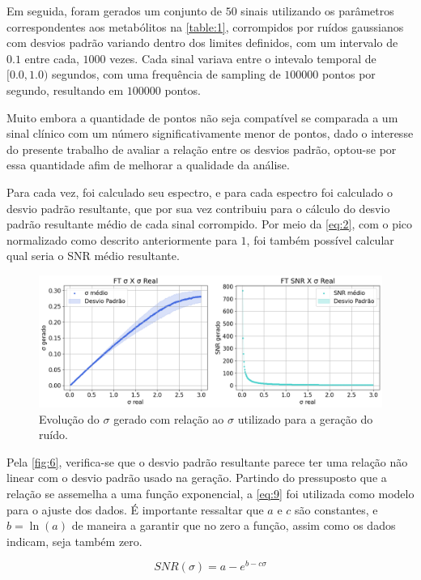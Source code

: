 \documentclass[
12pt,		
twoside, 
a4paper,
chapter=TITLE,
english,			
brazil]{USPSC-classe/USPSC}
\begin{document}
Em seguida, foram gerados um conjunto de $50$ sinais utilizando os parâmetros correspondentes aos metabólitos na \autoref{table:1}, corrompidos por ruídos gaussianos com desvios padrão variando dentro dos limites definidos, com um intervalo de $0.1$ entre cada, $1000$ vezes. Cada sinal variava 
entre o intevalo temporal de $[0.0, 1.0)$ segundos, com uma frequência de sampling de $100000$ pontos por segundo, resultando em $100000$ pontos. 

Muito embora a quantidade de pontos não seja compatível se comparada a um sinal clínico com um número significativamente menor de pontos, dado o interesse do presente trabalho de avaliar a relação entre os desvios padrão, optou-se por essa quantidade afim de melhorar a qualidade da análise.

Para cada vez, foi calculado seu espectro, e para cada espectro foi calculado o desvio padrão resultante, que por sua vez contribuiu para o cálculo do desvio padrão 
resultante médio de cada sinal corrompido. Por meio da \autoref{eq:2}, com o pico normalizado como descrito anteriormente para $1$, foi também possível calcular qual seria o SNR médio resultante.

\begin{figure} [H]
    \includegraphics[scale=0.37]{evolucao-sigmas.png}
    \centering
    \caption{Evolução do $\sigma$ gerado com relação ao $\sigma$ utilizado para a geração do ruído.}
    \label{fig:6}
\end{figure}

Pela \autoref{fig:6}, verifica-se que o desvio padrão resultante parece ter uma relação não linear com o desvio padrão usado na geração. Partindo do pressuposto que a relação se assemelha a uma função exponencial, a \autoref{eq:9} foi utilizada como modelo para o ajuste dos dados. É importante ressaltar que 
$a$ e $c$ são constantes, e $b = \ln(a)$ de maneira a garantir que no zero a função, assim como os dados indicam, seja também zero.

\begin{equation} \label{eq:9}
    SNR(\sigma) = a - e^{b - c\sigma} 
\end{equation}
\end{document}
